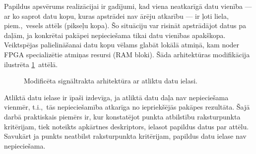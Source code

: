 Papildus apsvērums realizācijai ir gadījumi, kad viena neatkarīgā datu vienība
--- ar ko saprot datu kopu, kuras apstrādei nav ārēju atkarību --- ir
ļoti liela, piem.,~vesels attēls (pikseļu kopa).
Šo situāciju var risināt apstrādājot datus pa daļām, ja konkrētai pakāpei
nepieciešama tikai datu vienības apakškopa. Veiktspējas palielināšanai datu
kopu vēlams glabāt lokālā atmiņā, kam noder FPGA specializētie atmiņas
resursi (RAM bloki). Šāda arhitektūras modifikācija ilustrēta
\ref{fig:fpga-arch2}~attēlā.
\begin{figure}[tbh]
	\centering
	\def\svgscale{1.2}
	{}
	\caption{Modificēta signāltrakta arhitektūra ar atliktu datu ielasi.}
	\label{fig:fpga-arch2}
\end{figure}


Atliktā datu ielase ir īpaši izdevīga, ja
atliktā datu daļa nav nepieciešama vienmēr, t.i.,~tās nepieciešamība
atkarīga no iepriekšējās pakāpes rezultāta.
Šajā darbā praktiskais piemērs ir, 
kur konstatējot punkta atbilstību raksturpunkta kritērijam, tiek noteikts
apkārtnes deskriptors, ielasot papildus datus par attēlu.
Savukārt ja punkts neatbilst raksturpunkta kritērijam, papildus datu ielase
nav nepieciešama.


